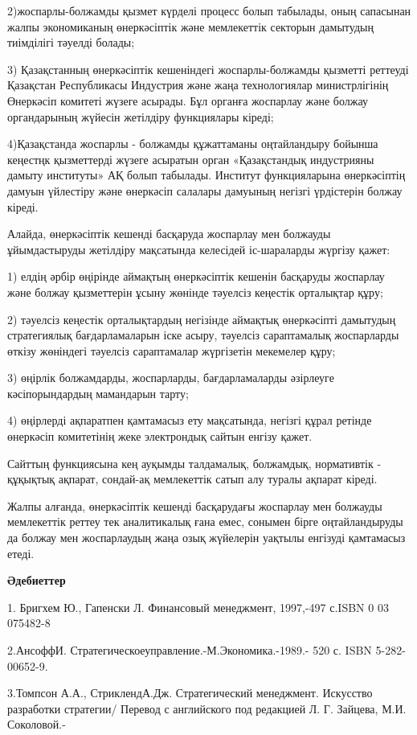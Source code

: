 2)жоспарлы-болжамды қызмет күрделі процесс болып табылады, оның
сапасынан жалпы экономиканың өнеркәсіптік және мемлекеттік секторын
дамытудың тиімділігі тәуелді болады;

3) Қазақстанның өнеркәсіптік кешеніндегі жоспарлы-болжамды қызметті
реттеуді Қазақстан Республикасы Индустрия және жаңа технологиялар
министрлігінің Өнеркәсіп комитеті жүзеге асырады. Бұл органға жоспарлау
және болжау органдарының жүйесін жетілдіру функциялары кіреді;

4)Қазақстанда жоспарлы - болжамды құжаттаманы оңтайландыру бойынша
кеңестңк қызметтерді жүзеге асыратын орган «Қазақстандық индустрияны
дамыту институты» АҚ болып табылады. Институт функцияларына өнеркәсіптің
дамуын үйлестіру және өнеркәсіп салалары дамуының негізгі үрдістерін
болжау кіреді.

Алайда, өнеркәсіптік кешенді басқаруда жоспарлау мен болжауды
ұйымдастыруды жетілдіру мақсатында келесідей іс-шараларды жүргізу қажет:

1) елдің әрбір өңірінде аймақтың өнеркәсіптік кешенін басқаруды
жоспарлау және болжау қызметтерін ұсыну жөнінде тәуелсіз кеңестік
орталықтар құру;

2) тәуелсіз кеңестік орталықтардың негізінде аймақтық өнеркәсіпті
дамытудың стратегиялық бағдарламаларын іске асыру, тәуелсіз сараптамалық
жоспарларды өткізу жөніндегі тәуелсіз сараптамалар жүргізетін мекемелер
құру;

3) өңірлік болжамдарды, жоспарларды, бағдарламаларды әзірлеуге
кәсіпорындардың мамандарын тарту;

4) өңірлерді ақпаратпен қамтамасыз ету мақсатында, негізгі құрал ретінде
өнеркәсіп комитетінің жеке электрондық сайтын енгізу қажет.

Сайттың функциясына кең ауқымды талдамалық, болжамдық, нормативтік -
құқықтық ақпарат, сондай-ақ мемлекеттік сатып алу туралы ақпарат кіреді.

Жалпы алғанда, өнеркәсіптік кешенді басқарудағы жоспарлау мен болжауды
мемлекеттік реттеу тек аналитикалық ғана емес, сонымен бірге
оңтайландыруды да болжау мен жоспарлаудың жаңа озық жүйелерін уақтылы
енгізуді қамтамасыз етеді.

{\bfseries Әдебиеттер}

1. Бригхем Ю., Гапенски Л. Финансовый менеджмент, 1997,-497 с.ISBN 0 03
075482-8

2.АнсоффИ. Стратегическоеуправление.-М.Экономика.-1989.- 520 с. ISBN
5-282-00652-9.

3.Томпсон А.А., СтриклендА.Дж. Стратегический менеджмент. Искусство
разработки стратегии/ Перевод с английского под редакцией Л. Г. Зайцева,
М.И. Соколовой.-

